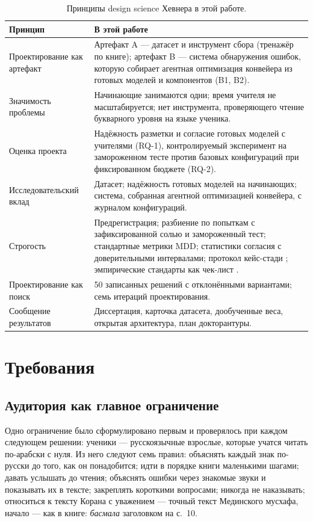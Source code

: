 \begin{table}[ht]
\centering\small
\caption{Принципы design science Хевнера \cite{SRC-100} в этой работе.}
\label{tab:hevner}
\begin{tabularx}{\linewidth}{@{}P{3.8cm}L@{}}
\toprule
Принцип & В этой работе \\
\midrule
Проектирование как артефакт & Артефакт A --- датасет и инструмент сбора (тренажёр по книге); артефакт B
--- система обнаружения ошибок, которую собирает агентная оптимизация конвейера из готовых моделей и компонентов (B1, B2). \\
Значимость проблемы & Начинающие занимаются одни; время учителя не масштабируется; нет инструмента,
проверяющего чтение букварного уровня на языке ученика. \\
Оценка проекта & Надёжность разметки и согласие готовых моделей с учителями (RQ-1), контролируемый
эксперимент на замороженном тесте против базовых конфигураций при фиксированном бюджете (RQ-2). \\
Исследовательский вклад & Датасет; надёжность готовых моделей на начинающих; система, собранная агентной оптимизацией конвейера, с журналом конфигураций. \\
Строгость & Предрегистрация; разбиение по попыткам с зафиксированной солью и замороженный тест; стандартные метрики MDD; статистики согласия с доверительными интервалами;
протокол кейс-стади \cite{SRC-102}; эмпирические стандарты как чек-лист \cite{SRC-103}. \\
Проектирование как поиск & 50 записанных решений с отклонёнными вариантами; семь итераций
проектирования. \\
Сообщение результатов & Диссертация, карточка датасета, дообученные веса, открытая архитектура,
план докторантуры. \\
\bottomrule
\end{tabularx}
\end{table}

\section{Требования}\label{sec:method-req}

\subsection{Аудитория как главное ограничение}

Одно ограничение было сформулировано первым и проверялось при каждом следующем решении: ученики ---
русскоязычные взрослые, которые учатся читать по-арабски с нуля. Из него следуют семь правил: объяснять
каждый знак по-русски до того, как он понадобится; идти в порядке книги маленькими шагами; давать
услышать до чтения; объяснять ошибки через знакомые звуки и показывать их в тексте; закреплять короткими
вопросами; никогда не наказывать; относиться к тексту Корана с уважением --- точный текст Мединского
мусхафа, начало --- как в книге: \emph{басмала} заголовком на с.~10.

